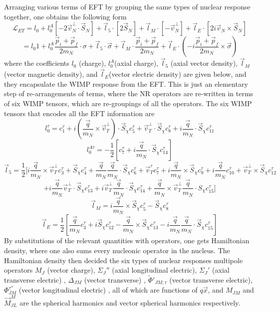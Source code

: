 \documentclass[12pt]{article}
\begin{document}
Arranging various terms of EFT by grouping the same types of nuclear response together, one obtains the following form 
$$
\mathcal L_{ET} = l_0 + l_0^A [ -2 \vec v_N^\bot \cdot \vec S_N] + \vec l_5 \cdot [2\vec S_N] + \vec l_M \cdot [-\vec v_N^\bot] + \vec l_E \cdot [2i \vec v_N \times \vec S_N ]
$$
$$
= l_0 1 + l_0^A \frac{\vec p_i + \vec p_f}{2m_N} \cdot \sigma + \vec l_5 \cdot \vec \sigma + \vec l_M \cdot  \frac{\vec p_i + \vec p_f}{2m_N} + \vec l_E \cdot (-i  \frac{\vec p_i + \vec p_f}{2m_N}\times \vec \sigma)
$$
where the coefficients $l_0$ (charge), $l_0^A$(axial charge), $\vec l_5$ (axial vector density), $\vec l_M$ (vector magnetic density), and $\vec l_E$(vector electric density) are given below, and they encapsulate the WIMP response from the EFT. 
This is just an elementary step of re-arrangements of terms, where the NR operators are re-written in terms of six WIMP tensors, which are re-groupings of all the operators. The six WIMP tensors that encodes all the EFT information are 
$$
l_0^\tau = c_1^\tau + i ( \frac{\vec q}{m_N} \times \vec v_T^\bot) \cdot \vec S_\chi c_5^\tau + \vec v_T^\bot \cdot \vec S_\chi c_8^\tau + i \frac{\vec q}{m_N}\cdot \vec S_\chi c_{11}^\tau
$$
$$
l_0^{A\tau} = -\frac{1}{2} [ c_7^\tau + i \frac {\vec q}{m_N} \cdot \vec S_\chi c_{14}^\tau ]
$$
$$
\vec l_5 = \frac{1}{2} [ i \frac{\vec q}{m_N} \times \vec v_T^\bot c_3^\tau + \vec S_\chi c_4^\tau + 
\frac{\vec q}{m_N}\frac{\vec q}{m_N}\cdot \vec S_\chi c_6 ^\tau + \vec v _T ^\tau c_7 ^\tau + i \frac{\vec q}{m_N} \times \vec S_\chi c_9^\tau 
+ i \frac{\vec q }{m_N} c_{10}^\tau 
+ \vec v_T^\bot \times \vec S_\chi c_{12}^\tau 
$$
$$+ i \frac{\vec q }{m_N} \vec v_T^\bot \cdot \vec S_\chi c_{13}^\tau + i \vec v_T^\bot \frac{\vec q }{m_N} \cdot \vec S_\chi c_{14}^\tau + \frac{\vec q }{m_N} \times \vec v_T^\bot \frac{\vec q}{m_N} \cdot S_\chi c_{15}^\tau]
$$
$$
\vec l_M = i \frac{\vec q}{m_N} \times \vec S_\chi c_5^\tau - \vec S_\chi c_8^\tau
$$
$$
\vec l_E = \frac{1}{2} [ \frac{\vec q}{m_N} c_3^\tau + i \vec S_\chi c_{12}^\tau - \frac{\vec q}{m_N}\times \vec S_\chi c_{13}^\tau - i \frac{\vec q}{m_N}\frac{\vec q}{m_N} \cdot \vec S_\chi c_{15}^\tau]
$$
By substitutions of the relevant quantities with operators, one gets Hamiltonian density, where one also sums every nucleonic operator in the nucleus. The Hamiltonian density then decided the six types of nuclear responses multipole operators $M_J$ (vector charge), 
$\Sigma_J''$ (axial longitudinal electric), 
$\Sigma_J'$ (axial transverse electric) ,
 $\Delta_{JM}$ (vector transverse) ,
  $\tilde \Phi'_{JM;\tau}$ (vector transverse electric),
   $ \Phi_{JM}^{\tau''} $ (vector longitudinal electric) ,
    all of which are functions of $q\vec x$, and $M_{JM}$ and $\vec M_{JL}^M $ are the spherical harmonics and vector spherical harmonics respectively. 
\end{document}
